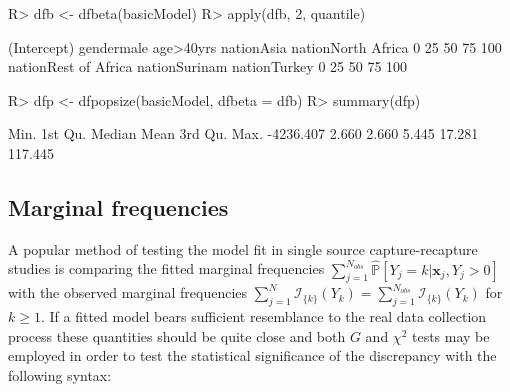 \documentclass[
]{jss}
\newcommand{\1}{\mathcal{I}} \newcommand{\bZero}{\boldsymbol{0}}
\begin{document}
\begin{CodeChunk}
\begin{CodeInput}
R> dfb <- dfbeta(basicModel)
R> apply(dfb, 2, quantile)
\end{CodeInput}
\begin{CodeOutput}
       (Intercept)    gendermale     age>40yrs    nationAsia nationNorth Africa
0%
25%
50%
75%
100%
     nationRest of Africa nationSurinam  nationTurkey
0%
25%
50%
75%
100%
\end{CodeOutput}
\end{CodeChunk}

\normalsize

\begin{CodeChunk}
\begin{CodeInput}
R> dfp <- dfpopsize(basicModel, dfbeta = dfb)
R> summary(dfp)
\end{CodeInput}
\begin{CodeOutput}
     Min.   1st Qu.    Median      Mean   3rd Qu.      Max. 
-4236.407     2.660     2.660     5.445    17.281   117.445 
\end{CodeOutput}
\end{CodeChunk}

\subsection{Marginal frequencies}\label{marginal-frequencies}

A popular method of testing the model fit in single source
capture-recapture studies is comparing the fitted marginal frequencies
\(\displaystyle\sum_{j=1}^{N_{obs}}\hat{\mathbb{P}}\left[Y_{j}=k|\boldsymbol{x}_{j}, Y_{j} > 0\right]\)
with the observed marginal frequencies
\(\displaystyle\sum_{j=1}^{N}\mathcal{I}_{\{k\}}(Y_{k})=\sum_{j=1}^{N_{obs}}\mathcal{I}_{\{k\}}(Y_{k})\)
for \(k\geq1\). If a fitted model bears sufficient resemblance to the
real data collection process these quantities should be quite close and
both \(G\) and \(\chi^{2}\) tests may be employed in order to test the
statistical significance of the discrepancy with the following
 syntax:
\end{document}

